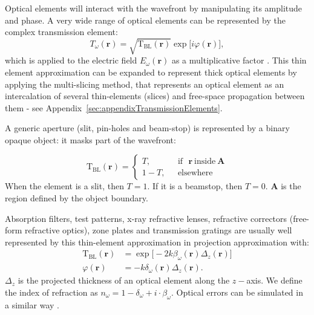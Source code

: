 \documentclass{iucr}              %
\begin{document}
Optical elements will interact with the wavefront by manipulating its amplitude and phase. A very wide range of optical elements can be represented by the complex transmission element:
 \begin{equation}\label{eq:trans_el}
T_\omega(\textbf{r})=\sqrt{\mathrm{T}_\mathrm{BL}(\textbf{r})}\exp{\big[ i\varphi(\textbf{r})\big]},
\end{equation}
which is applied to the electric field $E_\omega(\textbf{r})$ as a multiplicative factor \cite{Cloetens_1996}. This thin element approximation can be expanded to represent thick optical elements by applying the multi-slicing method, that represents an optical element as an intercalation of several thin-elements (slices) and free-space propagation between them \cite{paganin_book, Li2017, Munro2019} - see Appendix~\ref{sec:appendixTransmissionElements}. 

A generic aperture (slit, pin-holes and beam-stop) is represented by a binary opaque object: it masks part of the wavefront:

\begin{equation}
\mathrm{T}_{\text{BL}}(\textbf{r}) =
\left\{
\begin{matrix}
T,  & \mbox{~~if~~}  \textbf{r}~\text{inside}~ \textbf{A}
\\ 
1 - T, & \mbox{~~elsewhere}
\end{matrix}
\right.
\end{equation}
When the element is a slit, then $T=1$. If it is a beamstop, then $T=0$. $\textbf{A}$ is the region defined by the object boundary. 

Absorption filters, test patterns, x-ray refractive lenses, refractive correctors (free-form refractive optics), zone plates and transmission gratings are usually well represented by this thin-element approximation in projection approximation with:
\begin{subequations}
\begin{align}   
    \mathrm{T}_{\text{BL}}(\textbf{r})&=\exp{\big[-2k\beta_\omega(\textbf{r})\Delta_z(\textbf{r})\big]}\label{eq:aux_funcs_transa}  \\
    \varphi(\textbf{r})&=-k\delta_\omega(\textbf{r})\Delta_z(\textbf{r}).\label{eq:aux_funcs_transb}
\end{align}
\end{subequations}
$\Delta_z$ is the projected thickness of an optical element along the $z-$axis. We define the index of refraction as $n_\omega=1-\delta_\omega+i\cdot\beta_\omega$. Optical errors can be simulated in a similar way \cite{Laundy2014,Celestre:mo5214,srioLBL}.
\end{document}
